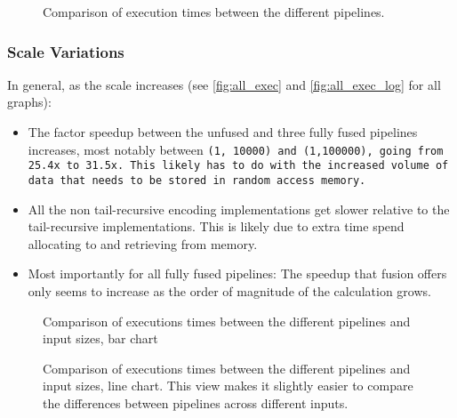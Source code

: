 \begin{figure}[h]
    
    \caption{Comparison of execution times between the different pipelines.}
    \label{fig:res_1000}
\end{figure}

\subsubsection{Scale Variations}\label{sec:scale_var}
In general, as the scale increases (see \autoref{fig:all_exec} and \autoref{fig:all_exec_log} for all graphs):
\begin{itemize}[noitemsep]
    \item The factor speedup between the unfused and three fully fused pipelines increases, most notably between \tt{(1, 10000)} and \tt{(1,100000)}, going from 25.4x to 31.5x.
    This likely has to do with the increased volume of data that needs to be stored in random access memory.
    \item All the non tail-recursive encoding implementations get slower relative to the tail-recursive implementations.
    This is likely due to extra time spend allocating to and retrieving from memory.
    \item Most importantly for all fully fused pipelines: The speedup that fusion offers only seems to increase as the order of magnitude of the calculation grows.
\end{itemize}

\begin{figure}[H]
    \centering
    
    \caption{Comparison of executions times between the different pipelines and input sizes, bar chart}
    \label{fig:results1}
\end{figure}
\begin{figure}[H]
    \centering
    
    \caption{Comparison of executions times between the different pipelines and input sizes, line chart. This view makes it slightly easier to compare the differences between pipelines across different inputs.}
    \label{fig:results2}
\end{figure}
